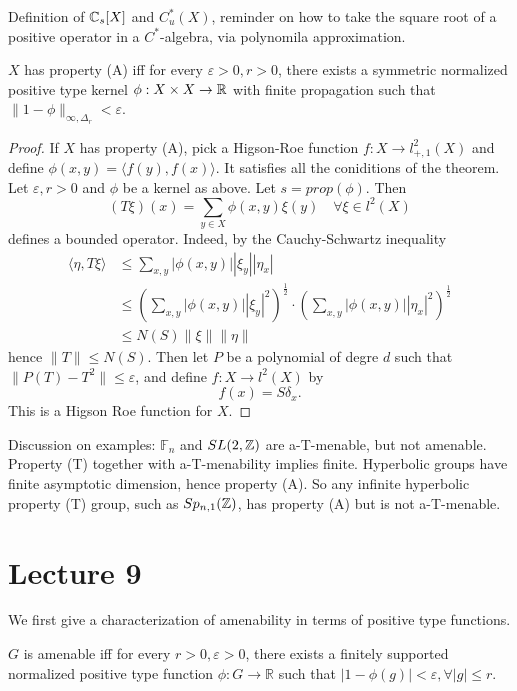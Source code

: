 Definition of $\mathbb C_s[X]$ and $C^*_u(X)$, reminder on how to take the square root of a positive operator in a $C^*$-algebra, via polynomila approximation.

\begin{thm}[Tu]
$X$ has property (A) iff for every $\varepsilon> 0, r>0$, there exists a symmetric normalized positive type kernel $\phi : X\times X \rightarrow \mathbb R$ with finite propagation such that $\|1-\phi\|_{\infty, \Delta_r}<\varepsilon$. 
\end{thm}

\begin{proof}
If $X$ has property (A), pick a Higson-Roe function $f: X\rightarrow l^2_{+,1}(X)$ and define $\phi(x,y)=\langle f(y), f(x)\rangle$. It satisfies all the coniditions of the theorem.\\

Let $\varepsilon, r>0$ and $\phi$ be a kernel as above. Let $s= prop(\phi)$. Then
\[(T\xi)(x)= \sum_{y\in X} \phi(x,y)\xi(y) \quad \forall \xi \in l^2(X)\]
defines a bounded operator. Indeed, by the Cauchy-Schwartz inequality
\[\begin{split}
\langle \eta, T\xi \rangle & \leq \sum_{x,y} |\phi(x,y)| |\xi_y| |\eta_x| \\
				& \leq \left( \sum_{x,y}|\phi(x,y)||\xi_y|^2\right)^{\frac{1}{2}}\cdot \left( \sum_{x,y} |\phi(x,y)| |\eta_x|^2 \right)^{\frac{1}{2}}\\
				& \leq N(S) \|\xi \|\|\eta\|
\end{split}\] 
hence $\|T\|\leq N(S)$. Then let $P$ be a polynomial of degre $d$ such that $\|P(T)-T^2\|\leq \varepsilon$, and define $f: X\rightarrow l^2(X)$ by  
\[f(x) = S\delta_x. \]
This is a Higson Roe function for $X$.
\end{proof}

Discussion on examples: $\mathbb F_n$ and $SL(2,\mathbb Z)$ are a-T-menable, but not amenable. Property (T) together with a-T-menability implies finite. Hyperbolic groups have finite asymptotic dimension, hence property (A). So any infinite hyperbolic property (T) group, such as $Sp_{n,1}(\mathbb Z)$, has property (A) but is not a-T-menable.  

\section{Lecture 9}

We first give a characterization of amenability in terms of positive type functions. 

\begin{prop}
$G$ is amenable iff for every $r> 0, \varepsilon>0$, there exists a finitely supported normalized positive type function $\phi : G \rightarrow \mathbb R$ such that $|1-\phi (g)|< \varepsilon , \forall |g|\leq r$.
\end{prop}

